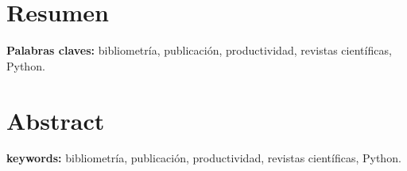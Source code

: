 \renewcommand{\abstractname}{Resumen}
\begingroup

\chapter*{Resumen}

\lipsum[2-4]

\textbf{Palabras claves:} bibliometría, publicación, productividad, revistas científicas, Python.

\chapter*{Abstract}

\lipsum[2-4]

\textbf{keywords:} bibliometría, publicación, productividad, revistas científicas, Python.

\vfill

\endgroup

\vfill
